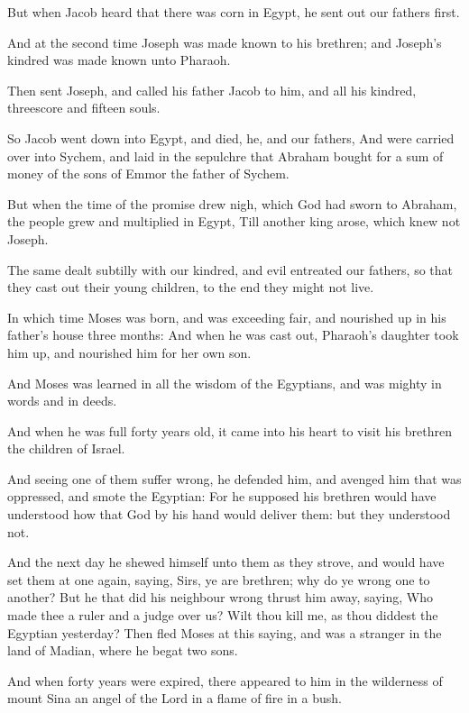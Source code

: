 \Verse But when Jacob heard that there was corn in Egypt, he sent out our fathers first.

\Verse And at the second time Joseph was made known to his brethren; and Joseph's kindred was made known unto Pharaoh.

\Verse Then sent Joseph, and called his father Jacob to him, and all his kindred, threescore and fifteen souls.

\Verse So Jacob went down into Egypt, and died, he, and our fathers, \Verse And were carried over into Sychem, and laid in the sepulchre that Abraham bought for a sum of money of the sons of Emmor the father of Sychem.

\Verse But when the time of the promise drew nigh, which God had sworn to Abraham, the people grew and multiplied in Egypt, \Verse Till another king arose, which knew not Joseph.

\Verse The same dealt subtilly with our kindred, and evil entreated our fathers, so that they cast out their young children, to the end they might not live.

\Verse In which time Moses was born, and was exceeding fair, and nourished up in his father's house three months: \Verse And when he was cast out, Pharaoh's daughter took him up, and nourished him for her own son.

\Verse And Moses was learned in all the wisdom of the Egyptians, and was mighty in words and in deeds.

\Verse And when he was full forty years old, it came into his heart to visit his brethren the children of Israel.

\Verse And seeing one of them suffer wrong, he defended him, and avenged him that was oppressed, and smote the Egyptian: \Verse For he supposed his brethren would have understood how that God by his hand would deliver them: but they understood not.

\Verse And the next day he shewed himself unto them as they strove, and would have set them at one again, saying, Sirs, ye are brethren; why do ye wrong one to another?  \Verse But he that did his neighbour wrong thrust him away, saying, Who made thee a ruler and a judge over us?  \Verse Wilt thou kill me, as thou diddest the Egyptian yesterday?  \Verse Then fled Moses at this saying, and was a stranger in the land of Madian, where he begat two sons.

\Verse And when forty years were expired, there appeared to him in the wilderness of mount Sina an angel of the Lord in a flame of fire in a bush.

